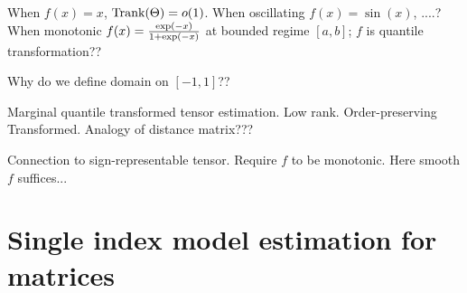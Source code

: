 \documentclass[final,12pt]{colt2020} %
\newtheorem{lem}{Lemma}
\def\rank{\textup{Trank}}
\begin{document}
When $f(x)=x$, $\rank(\Theta)=o(1)$. When oscillating $f(x)=\sin(x)$, ....? When monotonic $f(x)={\exp(-x)\over 1+\exp(-x)}$ at bounded regime $[a,b]$; $f$ is quantile transformation??

Why do we define domain on $[-1,1]$??

Marginal quantile transformed tensor estimation. Low rank. Order-preserving Transformed. Analogy of distance matrix??? 

Connection to sign-representable tensor. Require $f$ to be monotonic. Here smooth $f$ suffices...
\section{Single index model estimation for matrices}

\end{document}
